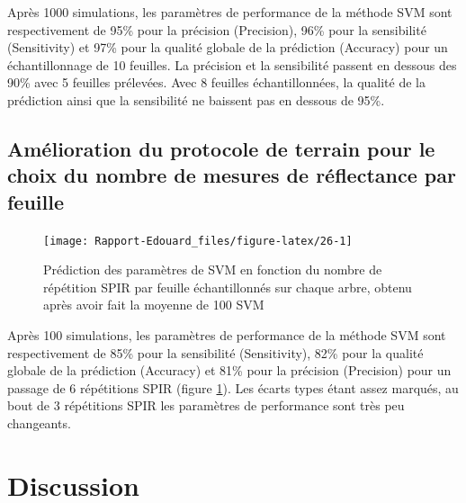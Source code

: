\documentclass[
  11pt,
  french,
  a4paper,
  extrafontsizes,onecolumn,openright
  ]{memoir}
\begin{document}
Après 1000 simulations, les paramètres de performance de la méthode SVM sont respectivement de 95\% pour la précision (Precision), 96\% pour la sensibilité (Sensitivity) et 97\% pour la qualité globale de la prédiction (Accuracy) pour un échantillonnage de 10 feuilles. La précision et la sensibilité passent en dessous des 90\% avec 5 feuilles prélevées. Avec 8 feuilles échantillonnées, la qualité de la prédiction ainsi que la sensibilité ne baissent pas en dessous de 95\%.

\vfill
\newpage

\hypertarget{amuxe9lioration-du-protocole-de-terrain-pour-le-choix-du-nombre-de-mesures-de-ruxe9flectance-par-feuille}{%
\section{Amélioration du protocole de terrain pour le choix du nombre de mesures de réflectance par feuille}\label{amuxe9lioration-du-protocole-de-terrain-pour-le-choix-du-nombre-de-mesures-de-ruxe9flectance-par-feuille}}

\scriptsize

\begin{figure}

{\centering \texttt{[image: Rapport-Edouard\_files/figure-latex/26-1]} 

}

\caption{Prédiction des paramètres de SVM en fonction du nombre de répétition SPIR par feuille échantillonnés sur chaque arbre, obtenu après avoir fait la moyenne de 100 SVM}\label{fig:26}
\end{figure}

\normalsize

Après 100 simulations, les paramètres de performance de la méthode SVM sont respectivement de 85\% pour la sensibilité (Sensitivity), 82\% pour la qualité globale de la prédiction (Accuracy) et 81\% pour la précision (Precision) pour un passage de 6 répétitions SPIR (figure \ref{fig:26}). Les écarts types étant assez marqués, au bout de 3 répétitions SPIR les paramètres de performance sont très peu changeants.

\vfill
\newpage

\hypertarget{discussion}{%
\chapter{Discussion}\label{discussion}}
\end{document}
